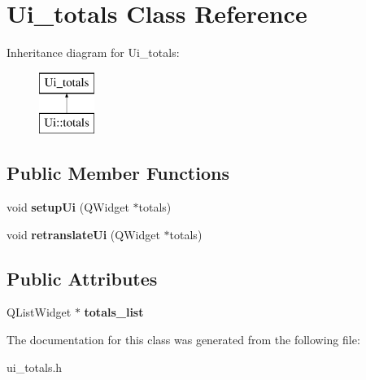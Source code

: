 \hypertarget{class_ui__totals}{}\section{Ui\+\_\+totals Class Reference}
\label{class_ui__totals}
Inheritance diagram for Ui\+\_\+totals\+:\begin{figure}[H]
\begin{center}
\leavevmode
\includegraphics[height=2.000000cm]{class_ui__totals}
\end{center}
\end{figure}
\subsection*{Public Member Functions}
\begin{DoxyCompactItemize}
\item 
\mbox{\label{class_ui__totals_a7340762e897871f4d67313ca67644bbe}} 
void {\bfseries setup\+Ui} (Q\+Widget $\ast$totals)
\item 
\mbox{\label{class_ui__totals_a903318c2f0c546b0ab49a8ec95e6d3aa}} 
void {\bfseries retranslate\+Ui} (Q\+Widget $\ast$totals)
\end{DoxyCompactItemize}
\subsection*{Public Attributes}
\begin{DoxyCompactItemize}
\item 
\mbox{\label{class_ui__totals_a57aeecd124fbac456c83be9bca8f603d}} 
Q\+List\+Widget $\ast$ {\bfseries totals\+\_\+list}
\end{DoxyCompactItemize}


The documentation for this class was generated from the following file\+:\begin{DoxyCompactItemize}
\item 
ui\+\_\+totals.\+h\end{DoxyCompactItemize}
